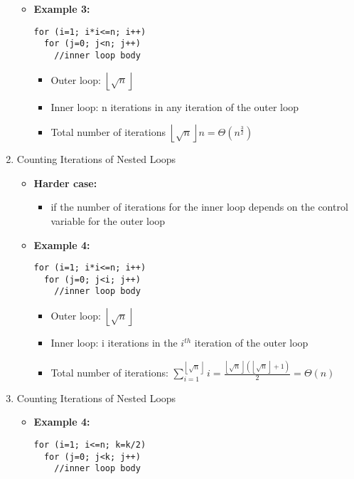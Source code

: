 \begin{enumerate}
\begin{itemize}
\begin{itemize}
    \end{itemize}
  \item \textbf{Example 3:}
\begin{lstlisting}
for (i=1; i*i<=n; i++)
  for (j=0; j<n; j++)
    //inner loop body
\end{lstlisting}
    \begin{itemize}
    \item Outer loop: $\left\lfloor\sqrt{n}\right\rfloor$
    \item Inner loop: n iterations in any iteration of the outer loop
    \item Total number of iterations $\left\lfloor\sqrt{n}\right\rfloor n=\Theta\left(n^{\frac{3}{2}}\right)$
    \end{itemize}
  \end{itemize}
\item Counting Iterations of Nested Loops
  \begin{itemize}
  \item \textbf{Harder case:}
    \begin{itemize}
    \item if the number of iterations for the inner loop depends on the control variable for the outer loop
    \end{itemize}
  \item \textbf{Example 4:}
\begin{lstlisting}
for (i=1; i*i<=n; i++)
  for (j=0; j<i; j++)
    //inner loop body
\end{lstlisting}
    \begin{itemize}
    \item Outer loop: $\left\lfloor\sqrt{n}\right\rfloor$
    \item Inner loop: i iterations in the $i^{th}$ iteration of the outer loop
    \item Total number of iterations: $ \displaystyle \sum\limits_{i=1}^{\left\lfloor\sqrt{n}\right\rfloor}i=\frac{\left\lfloor\sqrt{n}\right\rfloor\left(\left\lfloor\sqrt{n}\right\rfloor+1\right)}{2}=\Theta (n)$
    \end{itemize}
  \end{itemize}
\item Counting Iterations of Nested Loops
  \begin{itemize}
  \item \textbf{Example 4:}
\begin{lstlisting}
for (i=1; i<=n; k=k/2)
  for (j=0; j<k; j++)
    //inner loop body
\end{lstlisting}

\end{itemize}
\end{enumerate}
